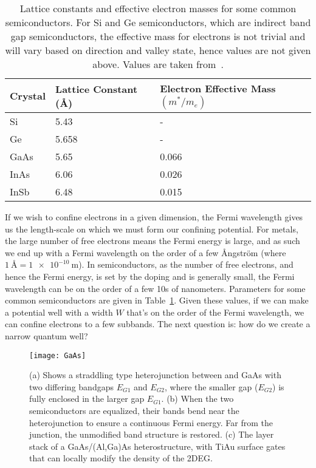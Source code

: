 \begin{table}
  \centering
  \begin{tabular}{|l|l|l|}
   \hline
   Crystal & Lattice Constant (\si{\angstrom}) & Electron Effective Mass$(m^*/m_e)$ \\
   \hline
   Si & 5.43 & - \\
   Ge & 5.658 & - \\
   GaAs & 5.65 & 0.066 \\
   InAs & 6.06 & 0.026 \\
   InSb & 6.48 & 0.015 \\
   \hline
  \end{tabular}
  \caption[Properties of some common Semiconductors]
  {Lattice constants and effective electron masses for some common semiconductors. For Si and Ge semiconductors, which are
  indirect band gap semiconductors, the effective mass for electrons is not trivial and will vary based
  on direction and valley state, hence values are not given above. Values are taken from~\cite{Kittel2004,InSbParam}.}
  \label{tab:semiprop}
\end{table}

If we wish to confine electrons in a given dimension, the Fermi wavelength gives us the length-scale on which we must form
our confining potential. For metals, the large number of free electrons means the Fermi energy is large, and as such we end up with a
Fermi wavelength on the order of a few Ångström (where $\SI{1}{\angstrom} = \SI{1e-10}{\meter}$). In semiconductors, as
the number of free electrons, and hence the Fermi energy, is set by the doping and is generally small, the Fermi
wavelength can be on the order of a few 10s of nanometers. Parameters for some common semiconductors are given
in Table~\ref{tab:semiprop}. Given these values, if we can make a potential well with a width $W$ that's on
the order of the Fermi wavelength, we can confine electrons to a few subbands. The next question is: how
do we create a narrow quantum well?

\begin{figure}
  \texttt{[image: GaAs]}
  \caption[Band bending in a straddling type heterojunction, and the GaAs/AlGaAs heterostructure]
  {\label{fig:heterostructure}(a) Shows a straddling type heterojunction between  and GaAs with two
  differing bandgaps $E_{G1}$ and $E_{G2}$, where the smaller gap ($E_{G2}$) is fully enclosed in the larger gap $E_{G1}$.
  (b) When the two semiconductors are equalized, their bands bend near the heterojunction to ensure a continuous Fermi energy.
  Far from the junction, the unmodified band structure is restored. (c) The layer stack of a GaAs/(Al,Ga)As heterostructure,
  with TiAu surface gates that can locally modify the density of the 2DEG.}
\end{figure}

